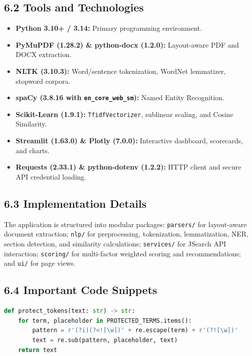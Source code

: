 \documentclass[11pt,a4paper]{article}
\begin{document}
\subsection{6.2 Tools and Technologies}
\begin{itemize}[noitemsep]
    \item \textbf{Python 3.10+ / 3.14:} Primary programming environment.
    \item \textbf{PyMuPDF (1.28.2) \& python-docx (1.2.0):} Layout-aware PDF and DOCX extraction.
    \item \textbf{NLTK (3.10.3):} Word/sentence tokenization, WordNet lemmatizer, stopword corpora.
    \item \textbf{spaCy (3.8.16 with \texttt{en\_core\_web\_sm}):} Named Entity Recognition.
    \item \textbf{Scikit-Learn (1.9.1):} \texttt{TfidfVectorizer}, sublinear scaling, and Cosine Similarity.
    \item \textbf{Streamlit (1.63.0) \& Plotly (7.0.0):} Interactive dashboard, scorecards, and charts.
    \item \textbf{Requests (2.33.1) \& python-dotenv (1.2.2):} HTTP client and secure API credential loading.
\end{itemize}

\subsection{6.3 Implementation Details}
The application is structured into modular packages: \texttt{parsers/} for layout-aware document extraction; \texttt{nlp/} for preprocessing, tokenization, lemmatization, NER, section detection, and similarity calculations; \texttt{services/} for JSearch API interaction; \texttt{scoring/} for multi-factor weighted scoring and recommendations; and \texttt{ui/} for page views.

\subsection{6.4 Important Code Snippets}
\begin{lstlisting}[language=Python, caption=Token Shielding Implementation (nlp/preprocessing.py)]
def protect_tokens(text: str) -> str:
    for term, placeholder in PROTECTED_TERMS.items():
        pattern = r'(?i)(?<![\w])' + re.escape(term) + r'(?![\w])'
        text = re.sub(pattern, placeholder, text)
    return text
\end{lstlisting}
\end{document}
